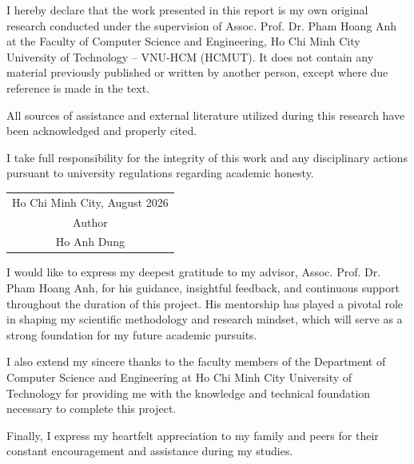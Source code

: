 \documentclass[a4paper,12pt]{report}
\begin{document}

\author{Ho Anh Dung - 2052921}


\beforepreface
{}

I hereby declare that the work presented in this report is my own original research conducted under the supervision of Assoc. Prof. Dr. Pham Hoang Anh at the Faculty of Computer Science and Engineering, Ho Chi Minh City University of Technology -- VNU-HCM (HCMUT). It does not contain any material previously published or written by another person, except where due reference is made in the text.

All sources of assistance and external literature utilized during this research have been acknowledged and properly cited.

I take full responsibility for the integrity of this work and any disciplinary actions pursuant to university regulations regarding academic honesty.

\begin{flushright}
\begin{tabular}{c}
    Ho Chi Minh City, August 2026\\
    Author\\
    Ho Anh Dung
\end{tabular}
\end{flushright}

I would like to express my deepest gratitude to my advisor, Assoc. Prof. Dr. Pham Hoang Anh, for his guidance, insightful feedback, and continuous support throughout the duration of this project. His mentorship has played a pivotal role in shaping my scientific methodology and research mindset, which will serve as a strong foundation for my future academic pursuits.

I also extend my sincere thanks to the faculty members of the Department of Computer Science and Engineering at Ho Chi Minh City University of Technology for providing me with the knowledge and technical foundation necessary to complete this project.

Finally, I express my heartfelt appreciation to my family and peers for their constant encouragement and assistance during my studies.
\end{document}
